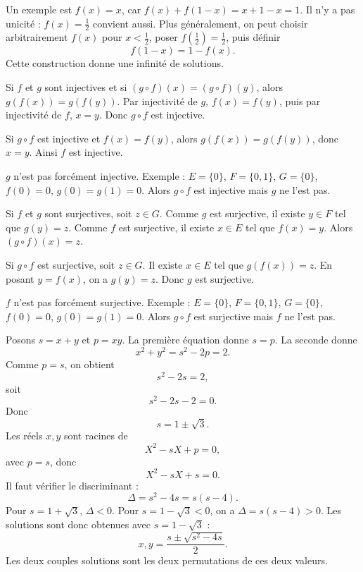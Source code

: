 \documentclass[11pt,a4paper]{article}
\begin{document}
\begin{correctionbox}[ORAUX 46]
Un exemple est \(f(x)=x\), car \(f(x)+f(1-x)=x+1-x=1\). Il n'y a pas unicité : \(f(x)=\frac12\) convient aussi. Plus généralement, on peut choisir arbitrairement \(f(x)\) pour \(x<\frac12\), poser \(f(\frac12)=\frac12\), puis définir
\[
f(1-x)=1-f(x).
\]
Cette construction donne une infinité de solutions.
\end{correctionbox}

\begin{correctionbox}[ORAUX 47]
Si \(f\) et \(g\) sont injectives et si \((g\circ f)(x)=(g\circ f)(y)\), alors \(g(f(x))=g(f(y))\). Par injectivité de \(g\), \(f(x)=f(y)\), puis par injectivité de \(f\), \(x=y\). Donc \(g\circ f\) est injective.

Si \(g\circ f\) est injective et \(f(x)=f(y)\), alors \(g(f(x))=g(f(y))\), donc \(x=y\). Ainsi \(f\) est injective.

\(g\) n'est pas forcément injective. Exemple : \(E=\{0\}\), \(F=\{0,1\}\), \(G=\{0\}\), \(f(0)=0\), \(g(0)=g(1)=0\). Alors \(g\circ f\) est injective mais \(g\) ne l'est pas.
\end{correctionbox}

\begin{correctionbox}[ORAUX 48]
Si \(f\) et \(g\) sont surjectives, soit \(z\in G\). Comme \(g\) est surjective, il existe \(y\in F\) tel que \(g(y)=z\). Comme \(f\) est surjective, il existe \(x\in E\) tel que \(f(x)=y\). Alors \((g\circ f)(x)=z\).

Si \(g\circ f\) est surjective, soit \(z\in G\). Il existe \(x\in E\) tel que \(g(f(x))=z\). En posant \(y=f(x)\), on a \(g(y)=z\). Donc \(g\) est surjective.

\(f\) n'est pas forcément surjective. Exemple : \(E=\{0\}\), \(F=\{0,1\}\), \(G=\{0\}\), \(f(0)=0\), \(g(0)=g(1)=0\). Alors \(g\circ f\) est surjective mais \(f\) ne l'est pas.
\end{correctionbox}

\begin{correctionbox}[ORAUX 49]
Posons \(s=x+y\) et \(p=xy\). La première équation donne \(s=p\). La seconde donne
\[
x^2+y^2=s^2-2p=2.
\]
Comme \(p=s\), on obtient
\[
s^2-2s=2,
\]
soit
\[
s^2-2s-2=0.
\]
Donc
\[
s=1\pm\sqrt3.
\]
Les réels \(x,y\) sont racines de
\[
X^2-sX+p=0,
\]
avec \(p=s\), donc
\[
X^2-sX+s=0.
\]
Il faut vérifier le discriminant :
\[
\Delta=s^2-4s=s(s-4).
\]
Pour \(s=1+\sqrt3\), \(\Delta<0\). Pour \(s=1-\sqrt3<0\), on a \(\Delta=s(s-4)>0\). Les solutions sont donc obtenues avec \(s=1-\sqrt3\) :
\[
x,y=\frac{s\pm\sqrt{s^2-4s}}2.
\]
Les deux couples solutions sont les deux permutations de ces deux valeurs.
\end{correctionbox}
\end{document}
